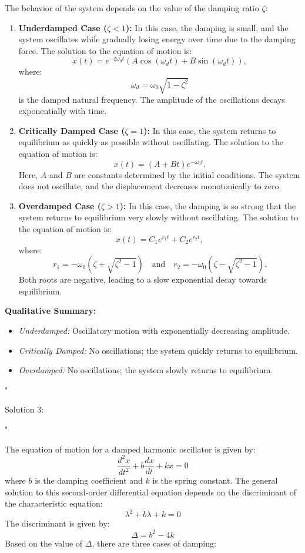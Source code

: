 The behavior of the system depends on the value of the damping ratio \( \zeta \):
\begin{enumerate}
    \item \textbf{Underdamped Case (\( \zeta < 1 \)):}  
    In this case, the damping is small, and the system oscillates while gradually losing energy over time due to the damping force. The solution to the equation of motion is:
    \[
    x(t) = e^{-\zeta \omega_0 t} \left( A \cos(\omega_d t) + B \sin(\omega_d t) \right),
    \]
    where:
    \[
    \omega_d = \omega_0 \sqrt{1 - \zeta^2}
    \]
    is the damped natural frequency. The amplitude of the oscillations decays exponentially with time.

    \item \textbf{Critically Damped Case (\( \zeta = 1 \)):}  
    In this case, the system returns to equilibrium as quickly as possible without oscillating. The solution to the equation of motion is:
    \[
    x(t) = (A + Bt)e^{-\omega_0 t}.
    \]
    Here, \( A \) and \( B \) are constants determined by the initial conditions. The system does not oscillate, and the displacement decreases monotonically to zero.

    \item \textbf{Overdamped Case (\( \zeta > 1 \)):}  
    In this case, the damping is so strong that the system returns to equilibrium very slowly without oscillating. The solution to the equation of motion is:
    \[
    x(t) = C_1 e^{r_1 t} + C_2 e^{r_2 t},
    \]
    where:
    \[
    r_1 = -\omega_0 (\zeta + \sqrt{\zeta^2 - 1}) \quad \text{and} \quad r_2 = -\omega_0 (\zeta - \sqrt{\zeta^2 - 1}).
    \]
    Both roots are negative, leading to a slow exponential decay towards equilibrium.

\end{enumerate}

\textbf{Qualitative Summary:}
\begin{itemize}
    \item \textit{Underdamped:} Oscillatory motion with exponentially decreasing amplitude.
    \item \textit{Critically Damped:} No oscillations; the system quickly returns to equilibrium.
    \item \textit{Overdamped:} No oscillations; the system slowly returns to equilibrium.
\end{itemize}
"

Solution 3:

"

The equation of motion for a damped harmonic oscillator is given by:
\[
\frac{d^2x}{dt^2} + b\frac{dx}{dt} + kx = 0
\]
where \(b\) is the damping coefficient and \(k\) is the spring constant. The general solution to this second-order differential equation depends on the discriminant of the characteristic equation:
\[
\lambda^2 + b\lambda + k = 0
\]
The discriminant is given by:
\[
\Delta = b^2 - 4k
\]
Based on the value of \(\Delta\), there are three cases of damping:

